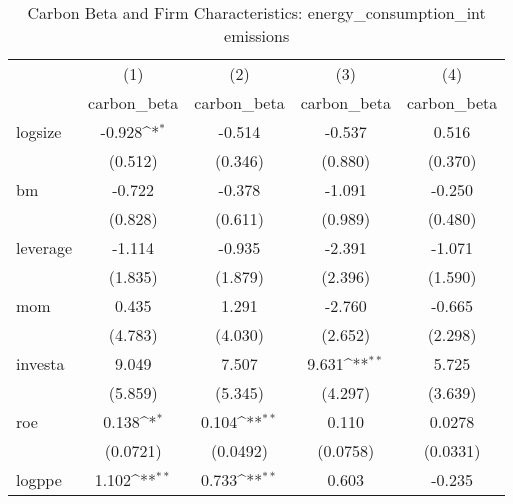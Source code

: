 \begin{table}[htbp]\centering
\def\sym#1{\ifmmode^{#1}\else\(^{#1}\)\fi}
\caption{Carbon Beta and Firm Characteristics: energy\_consumption\_int emissions}
\begin{tabular}{l*{4}{c}}
\hline\hline
                    &\multicolumn{1}{c}{(1)}&\multicolumn{1}{c}{(2)}&\multicolumn{1}{c}{(3)}&\multicolumn{1}{c}{(4)}\\
                    &\multicolumn{1}{c}{carbon\_beta}&\multicolumn{1}{c}{carbon\_beta}&\multicolumn{1}{c}{carbon\_beta}&\multicolumn{1}{c}{carbon\_beta}\\
\hline
logsize             &      -0.928\sym{*}  &      -0.514         &      -0.537         &       0.516         \\
                    &     (0.512)         &     (0.346)         &     (0.880)         &     (0.370)         \\
[1em]
bm                  &      -0.722         &      -0.378         &      -1.091         &      -0.250         \\
                    &     (0.828)         &     (0.611)         &     (0.989)         &     (0.480)         \\
[1em]
leverage            &      -1.114         &      -0.935         &      -2.391         &      -1.071         \\
                    &     (1.835)         &     (1.879)         &     (2.396)         &     (1.590)         \\
[1em]
mom                 &       0.435         &       1.291         &      -2.760         &      -0.665         \\
                    &     (4.783)         &     (4.030)         &     (2.652)         &     (2.298)         \\
[1em]
investa             &       9.049         &       7.507         &       9.631\sym{**} &       5.725         \\
                    &     (5.859)         &     (5.345)         &     (4.297)         &     (3.639)         \\
[1em]
roe                 &       0.138\sym{*}  &       0.104\sym{**} &       0.110         &      0.0278         \\
                    &    (0.0721)         &    (0.0492)         &    (0.0758)         &    (0.0331)         \\
[1em]
logppe              &       1.102\sym{**} &       0.733\sym{**} &       0.603         &      -0.235         \\

\end{tabular}
\end{table}
